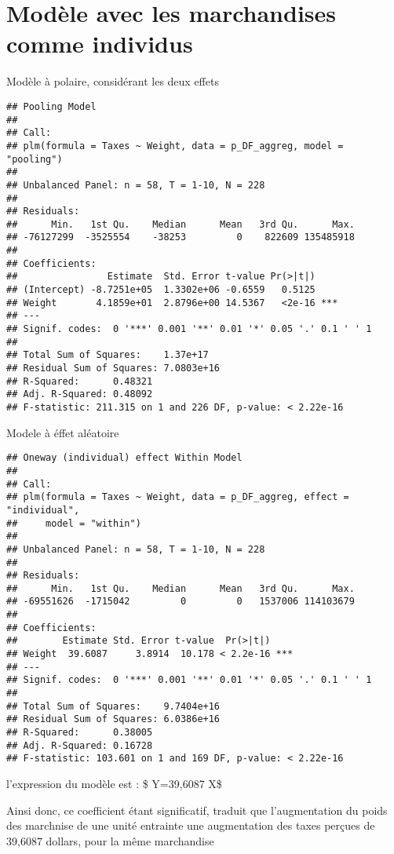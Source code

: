 \documentclass[
]{book}
\begin{document}
\hypertarget{moduxe8le-avec-les-marchandises-comme-individus}{%
\chapter{Modèle avec les marchandises comme individus}\label{moduxe8le-avec-les-marchandises-comme-individus}}

Modèle à polaire, considérant les deux effets

\begin{verbatim}
## Pooling Model
## 
## Call:
## plm(formula = Taxes ~ Weight, data = p_DF_aggreg, model = "pooling")
## 
## Unbalanced Panel: n = 58, T = 1-10, N = 228
## 
## Residuals:
##      Min.   1st Qu.    Median      Mean   3rd Qu.      Max. 
## -76127299  -3525554    -38253         0    822609 135485918 
## 
## Coefficients:
##                Estimate  Std. Error t-value Pr(>|t|)    
## (Intercept) -8.7251e+05  1.3302e+06 -0.6559   0.5125    
## Weight       4.1859e+01  2.8796e+00 14.5367   <2e-16 ***
## ---
## Signif. codes:  0 '***' 0.001 '**' 0.01 '*' 0.05 '.' 0.1 ' ' 1
## 
## Total Sum of Squares:    1.37e+17
## Residual Sum of Squares: 7.0803e+16
## R-Squared:      0.48321
## Adj. R-Squared: 0.48092
## F-statistic: 211.315 on 1 and 226 DF, p-value: < 2.22e-16
\end{verbatim}

Modele à éffet aléatoire

\begin{verbatim}
## Oneway (individual) effect Within Model
## 
## Call:
## plm(formula = Taxes ~ Weight, data = p_DF_aggreg, effect = "individual", 
##     model = "within")
## 
## Unbalanced Panel: n = 58, T = 1-10, N = 228
## 
## Residuals:
##      Min.   1st Qu.    Median      Mean   3rd Qu.      Max. 
## -69551626  -1715042         0         0   1537006 114103679 
## 
## Coefficients:
##        Estimate Std. Error t-value  Pr(>|t|)    
## Weight  39.6087     3.8914  10.178 < 2.2e-16 ***
## ---
## Signif. codes:  0 '***' 0.001 '**' 0.01 '*' 0.05 '.' 0.1 ' ' 1
## 
## Total Sum of Squares:    9.7404e+16
## Residual Sum of Squares: 6.0386e+16
## R-Squared:      0.38005
## Adj. R-Squared: 0.16728
## F-statistic: 103.601 on 1 and 169 DF, p-value: < 2.22e-16
\end{verbatim}

l'expression du modèle est : \$ Y=39,6087 X\$

Ainsi donc, ce coefficient étant significatif, traduit que l'augmentation du poids des marchnise de une unité entrainte une augmentation des taxes perçues de 39,6087 dollars, pour la même marchandise
\end{document}
